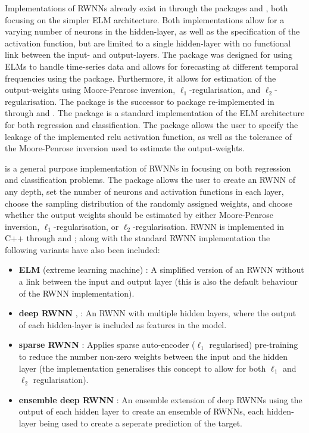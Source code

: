 \documentclass[
]{jss}
\providecommand{\tightlist}{%
  \setlength{\itemsep}{0pt}\setlength{\parskip}{0pt}}
\begin{document}
Implementations of RWNNs already exist in  through the
packages  \citep{nnfor} and 
\citep{elmNNRcpp}, both focusing on the simpler ELM architecture. Both
implementations allow for a varying number of neurons in the
hidden-layer, as well as the specification of the activation function,
but are limited to a single hidden-layer with no functional link between
the input- and output-layers. The  package was designed for
using ELMs to handle time-series data and allows for forecasting at
different temporal frequencies using the  package.
Furthermore, it allows for estimation of the output-weights using
Moore-Penrose inversion, \(\ell_1\)-regularisation, and
\(\ell_2\)-regularisation. The  package is the successor
to  package \citep{elmNN} re-implemented in 
through  and  \citep[\citet{RcppA}]{Rcpp}.
The package is a standard implementation of the ELM architecture for
both regression and classification. The package allows the user to
specify the leakage of the implemented relu activation function, as well
as the tolerance of the Moore-Penrose inversion used to estimate the
output-weights.

 is a general purpose implementation of RWNNs in 
\citep{R} focusing on both regression and classification problems. The
 package allows the user to create an RWNN of any depth, set
the number of neurons and activation functions in each layer, choose the
sampling distribution of the randomly assigned weights, and choose
whether the output weights should be estimated by either Moore-Penrose
inversion, \(\ell_1\)-regularisation, or \(\ell_2\)-regularisation. RWNN
is implemented in C++ through  and ; along
with the standard RWNN implementation the following variants have also
been included:

\begin{itemize}
\tightlist
\item
  \textbf{ELM} (extreme learning machine) \citep{Huang2006}: A
  simplified version of an RWNN without a link between the input and
  output layer (this is also the default behaviour of the RWNN
  implementation).
\item
  \textbf{deep RWNN} \citep{Henriquez2018}, \citep{Shi2021}: An RWNN
  with multiple hidden layers, where the output of each hidden-layer is
  included as features in the model.
\item
  \textbf{sparse RWNN} \citep{Zhang2019}: Applies sparse auto-encoder
  (\(\ell_1\) regularised) pre-training to reduce the number non-zero
  weights between the input and the hidden layer (the implementation
  generalises this concept to allow for both \(\ell_1\) and \(\ell_2\)
  regularisation).
\item
  \textbf{ensemble deep RWNN} \citep{Shi2021}: An ensemble extension of
  deep RWNNs using the output of each hidden layer to create an ensemble
  of RWNNs, each hidden-layer being used to create a seperate prediction
  of the target.
\end{itemize}
\end{document}
